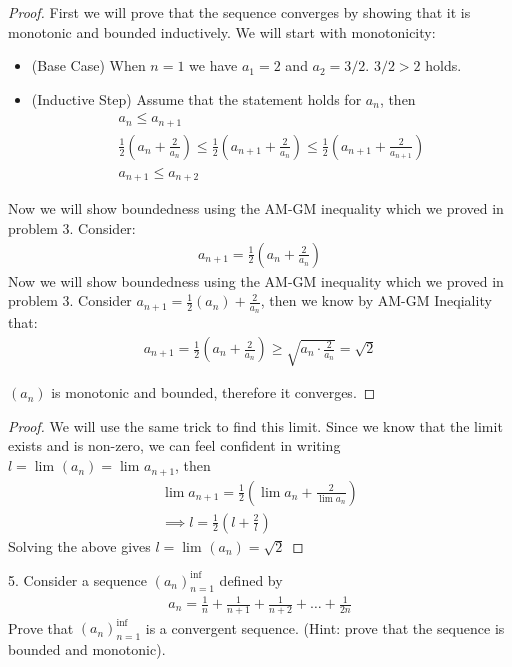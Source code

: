 \begin{proof}
	First we will prove that the sequence converges by showing that it is monotonic and bounded inductively. We will start with monotonicity:
	\begin{itemize}
		\item (Base Case) When $n=1$ we have $a_1 = 2$ and $a_2 = 3 / 2$. $3 / 2 > 2$ holds.
		\item (Inductive Step) Assume that the statement holds for $a_n$, then 
			 \begin{align}
				a_n \le a_{n+1}\\
				\frac{1}{2}\left( a_n + \frac{2}{a_n} \right)  \le \frac{1}{2} \left(a_{n+1} + \frac{2}{a_n}\right) \le \frac{1}{2}\left( a_{n+1} + \frac{2}{a_{n+1}} \right) \\	
				a_{n+1} \le a_{n+2}
			\end{align}
	\end{itemize}
	Now we will show boundedness using the AM-GM inequality which we proved in problem $3$. Consider:
	\begin{align}
		a_{n+1} = \frac{1}{2} \left( a_n + \frac{2}{a_n} \right)
	\end{align}
	Now we will show boundedness using the AM-GM inequality which we proved in problem $3$. Consider $a_{n+1} = \frac{1}{2}\left( a_n \right) +\frac{2}{a_n}$, then we know by AM-GM Ineqiality that:
	\begin{align}
		a_{n+1} = \frac{1}{2}\left( a_n + \frac{2}{a_n} \right) \ge   \sqrt{a_n \cdot \frac{2}{a_n}} = \sqrt{2} 
	\end{align}

	$\left( a_n \right) $ is monotonic and bounded, therefore it converges.
\end{proof}

\begin{proof}
	We will use the same trick to find this limit. Since we know that the limit exists and is non-zero, we can feel confident in writing $l = \lim_{} \left( a_n \right) = \lim_{} a_{n+1}$, then
	\begin{align}
		\lim_{} a_{n+1} = \frac{1}{2}\left( \lim_{} a_n + \frac{2}{\lim_{} a_n}\right) \\
		\implies l = \frac{1}{2}\left( l + \frac{2}{l} \right) 
	\end{align}
	Solving the above gives $l = \lim_{} \left( a_n \right)  = \sqrt{2} $

\end{proof}
5. Consider a sequence $\left( a_n \right)_{n=1}^{\inf }$ defined by 
\begin{align}
	a_n = \frac{1}{n} + \frac{1}{n+1} + \frac{1}{n+2} + \ldots + \frac{1}{2n}
\end{align}
Prove that $\left( a_n \right)_{n=1}^{\inf }$ is a convergent sequence. (Hint: prove that the sequence is bounded and monotonic).

